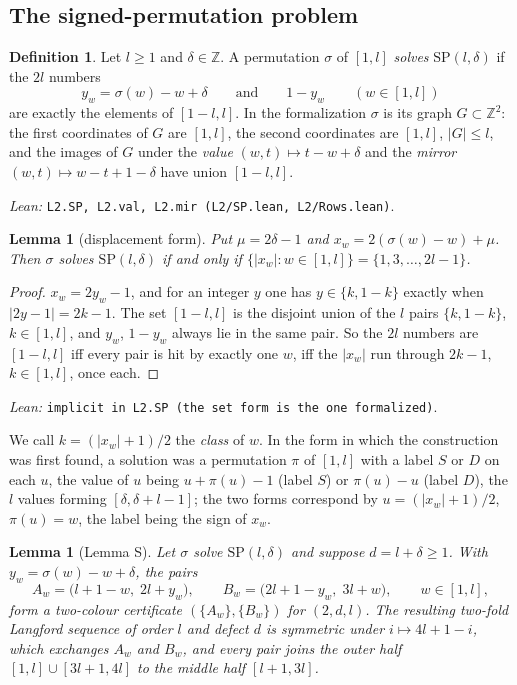 \documentclass[11pt]{amsart}
\theoremstyle{plain}
\newtheorem{lemma}[theorem]{Lemma}
\theoremstyle{definition}
\newtheorem{definition}[theorem]{Definition}
\theoremstyle{remark}
\newcommand{\Z}{\mathbb{Z}}
\newcommand{\SP}{\mathrm{SP}}
\newcommand{\lean}[1]{\par\smallskip
  {\small\raggedright\noindent\textit{Lean:} \texttt{#1}.\par}\smallskip}
\begin{document}
\subsection*{The signed-permutation problem}

\begin{definition}\label{def:SP}
Let $l \ge 1$ and $\delta \in \Z$. A permutation $\sigma$ of $[1,l]$ \emph{solves}
$\SP(l,\delta)$ if the $2l$ numbers
\[
  y_w = \sigma(w) - w + \delta \qquad\text{and}\qquad 1 - y_w \qquad (w \in [1,l])
\]
are exactly the elements of $[1-l,l]$. In the formalization $\sigma$ is its graph
$G \subset \Z^2$: the first coordinates of $G$ are $[1,l]$, the second coordinates are
$[1,l]$, $|G| \le l$, and the images of $G$ under the \emph{value} $(w,t) \mapsto
t-w+\delta$ and the \emph{mirror} $(w,t) \mapsto w-t+1-\delta$ have union $[1-l,l]$.
\end{definition}
\lean{L2.SP, L2.val, L2.mir (L2/SP.lean, L2/Rows.lean)}

\begin{lemma}[displacement form]\label{lem:P}
Put $\mu = 2\delta - 1$ and $x_w = 2(\sigma(w)-w) + \mu$. Then $\sigma$ solves
$\SP(l,\delta)$ if and only if $\{|x_w| : w \in [1,l]\} = \{1,3,\dots,2l-1\}$.
\end{lemma}

\begin{proof}
$x_w = 2y_w - 1$, and for an integer $y$ one has $y \in \{k,1-k\}$ exactly when
$|2y-1| = 2k-1$. The set $[1-l,l]$ is the disjoint union of the $l$ pairs
$\{k,1-k\}$, $k \in [1,l]$, and $y_w$, $1-y_w$ always lie in the same pair. So the $2l$
numbers are $[1-l,l]$ iff every pair is hit by exactly one $w$, iff the $|x_w|$ run
through $2k-1$, $k \in [1,l]$, once each.
\end{proof}
\lean{implicit in L2.SP (the set form is the one formalized)}

We call $k = (|x_w|+1)/2$ the \emph{class} of $w$. In the form in which the
construction was first found, a solution was a permutation $\pi$ of $[1,l]$ with a label
$S$ or $D$ on each $u$, the value of $u$ being $u + \pi(u) - 1$ (label $S$) or
$\pi(u) - u$ (label $D$), the $l$ values forming $[\delta,\delta+l-1]$; the two forms
correspond by $u = (|x_w|+1)/2$, $\pi(u) = w$, the label being the sign of $x_w$.

\begin{lemma}[Lemma S]\label{lem:S}
Let $\sigma$ solve $\SP(l,\delta)$ and suppose $d = l + \delta \ge 1$. With
$y_w = \sigma(w) - w + \delta$, the pairs
\[
  A_w = \bigl(l+1-w,\; 2l+y_w\bigr), \qquad B_w = \bigl(2l+1-y_w,\; 3l+w\bigr),
  \qquad w \in [1,l],
\]
form a two-colour certificate $(\{A_w\},\{B_w\})$ for $(2,d,l)$. The resulting two-fold
Langford sequence of order $l$ and defect $d$ is symmetric under $i \mapsto 4l+1-i$,
which exchanges $A_w$ and $B_w$, and every pair joins the outer half
$[1,l] \cup [3l+1,4l]$ to the middle half $[l+1,3l]$.
\end{lemma}
\end{document}
